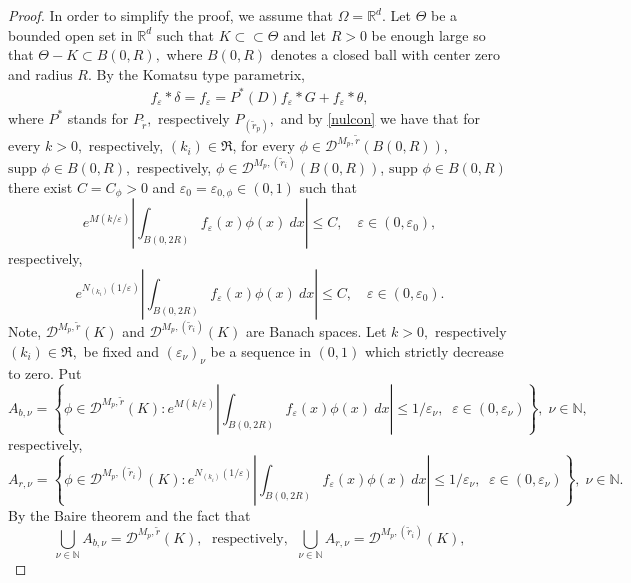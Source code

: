 \documentclass[sn-mathphys,Numbered]{sn-jnl}%
\theoremstyle{thmstyleone}%
\theoremstyle{thmstyletwo}%
\theoremstyle{thmstylethree}%
\begin{document}
\begin{proof}
In order to simplify the proof, we assume that  $\Omega=\mathbb R^d$. Let $\Theta$ be a bounded open set  in $ \mathbb R^d$ such that $K\subset\subset\Theta$ and let $R>0$ be enough large so that   $\Theta-K\subset B(0,R),$ where $B(0,R)$ denotes a closed ball with center zero and radius $R$.  By the Komatsu type parametrix,
\begin{align*}
f_\varepsilon*\delta=f_\varepsilon=P^*(D)f_\varepsilon*G+f_\varepsilon*\theta,
\end{align*}
where $P^*$ stands for $P_{\tilde r},$ respectively $P_{(\tilde r_p)},$
and by \eqref{nulcon} we have that for every $k>0,$ respectively, $(k_i)\in\mathfrak R$, for every $\phi\in\mathcal D^{M_p,\tilde r}(B(0,R))$,  $\mbox{supp } \phi\in B(0,R),$ respectively,  $\phi\in\mathcal D^{M_p,(\tilde r_i)}(B(0,R))$,  $\mbox{supp } \phi\in B(0,R)$ there exist $C=C_\phi>0$ and  $\varepsilon_0=\varepsilon_{0,\phi}\in(0,1)$ such that
\begin{equation*}%
e^{M(k/\varepsilon)}\left|\int_{B(0,2R)} f_\varepsilon(x)\phi(x)\ dx\right|\leq C,\quad \varepsilon\in (0,\varepsilon_0),
\end{equation*}
respectively,
\begin{equation*}%
e^{N_{(k_i)}(1/\varepsilon)}\left|\int_{B(0,2R)} f_\varepsilon(x)\phi(x)\ dx\right|\leq C,\quad \varepsilon\in (0,\varepsilon_0).
\end{equation*}
Note,  $\mathcal D^{M_p,\tilde r}(K)$ and $\mathcal D^{M_p,(\tilde r_i)}(K)$ are Banach spaces.
Let $k>0,$ respectively $(k_i)\in\mathfrak R,$ be fixed and $(\varepsilon_\nu)_\nu$ be a sequence in $(0,1)$ which strictly decrease to zero.
Put
\begin{equation*}
A_{b,\nu}=\left\{ \phi\in \mathcal D^{M_p,\tilde r}(K): 
e^{M(k/\varepsilon)}\left|\int_{B(0,2R)} f_\varepsilon(x)\phi(x)\ dx\right|\leq1/\varepsilon_\nu,\;\; \varepsilon\in (0,\varepsilon_{\nu})\right\}, \;\nu\in\mathbb N,
\end{equation*}
respectively,
\begin{equation*}
A_{r,\nu}=\left\{ \phi\in \mathcal D^{M_p,(\tilde r_i)}(K): 
e^{N_{(k_i)}(1/\varepsilon)}\left|\int_{B(0,2R)} f_\varepsilon(x)\phi(x)\ dx\right|\leq1/\varepsilon_\nu,\;\; \varepsilon\in (0,\varepsilon_{\nu})\right\},\; \nu\in\mathbb N.
\end{equation*}
 By the Baire theorem  and the fact that
 \begin{equation*}
\bigcup_{\nu\in\mathbb N}A_{b,\nu}= \mathcal D^{M_p,\tilde r}(K),\; \mbox{ respectively, }\;\bigcup_{\nu\in\mathbb N}A_{r,\nu}= \mathcal D^{M_p,(\tilde r_i)}(K),

\end{equation*}
\end{proof}
\end{document}
